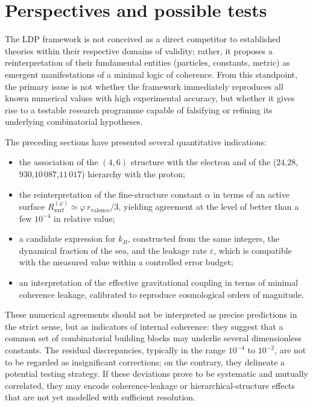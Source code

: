 \documentclass[11pt,a4paper]{article}
\begin{document}
\section{Perspectives and possible tests}
The LDP framework is not conceived as a direct competitor to established theories within their respective domains of validity; rather, it proposes a reinterpretation of their fundamental entities (particles, constants, metric) as emergent manifestations of a minimal logic of coherence. From this standpoint, the primary issue is not whether the framework immediately reproduces all known numerical values with high experimental accuracy, but whether it gives rise to a testable research programme capable of falsifying or refining its underlying combinatorial hypotheses.

The preceding sections have presented several quantitative indications:
\begin{itemize}[label=-]
    \item the association of the \((4,6)\) structure with the electron and of the (\(24\),\(28\),\(930\),\(10\,087\),\(11\,017\)) hierarchy with the proton;
    \item the reinterpretation of the fine-structure constant \(\alpha\) in terms of an active surface \(R_{\mathrm{surf}}^{(\varphi)} \simeq \varphi \, r_{\mathrm{valence}}/3\), yielding agreement at the level of better than a few \(10^{-4}\) in relative value;
    \item a candidate expression for \(k_{B}\), constructed from the same integers, the dynamical fraction of the sea, and the leakage rate \(\varepsilon\), which is compatible with the measured value within a controlled error budget;
    \item an interpretation of the effective gravitational coupling in terms of minimal coherence leakage, calibrated to reproduce cosmological orders of magnitude.
\end{itemize}
These numerical agreements should not be interpreted as precise predictions in the strict sense, but as indicators of internal coherence: they suggest that a common set of combinatorial building blocks may underlie several dimensionless constants. The residual discrepancies, typically in the range \(10^{-4}\) to \(10^{-2}\), are not to be regarded as insignificant corrections; on the contrary, they delineate a potential testing strategy. If these deviations prove to be systematic and mutually correlated, they may encode coherence-leakage or hierarchical-structure effects that are not yet modelled with sufficient resolution.
\end{document}
